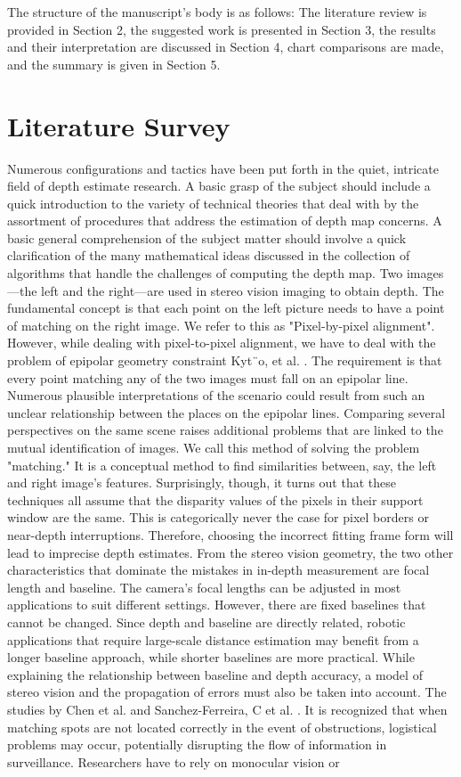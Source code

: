 \documentclass[sn-mathphys]{sn-jnl}%
\theoremstyle{thmstyleone}%
\theoremstyle{thmstyletwo}%
\theoremstyle{thmstylethree}%
\begin{document}
The structure of the manuscript's body is as follows: The literature review is provided in Section 2, the suggested work is presented in Section 3, the results and their interpretation are discussed in Section 4, chart comparisons are made, and the summary is given in Section 5.

\section{Literature Survey}\label{sec2}

Numerous configurations and tactics have been put forth in the quiet, intricate field of depth estimate research. A basic grasp of the subject should include a quick introduction to the variety of technical theories that deal with by the assortment of procedures that address the estimation of depth map concerns. A basic general comprehension of the subject matter should involve a quick clarification of the many mathematical ideas discussed in the collection of algorithms that handle the challenges of computing the depth map. Two images—the left and the right—are used in stereo vision imaging to obtain depth. The fundamental concept is that each point on the left picture needs to have a point of matching on the right image. We refer to this as "Pixel-by-pixel alignment". However, while dealing with pixel-to-pixel alignment, we have to deal with the problem of epipolar geometry constraint Kyt¨o, et al. \cite{bib2}. The requirement is that every point matching any of the two images must fall on an epipolar line. Numerous plausible interpretations of the scenario could result from such an unclear relationship between the places on the epipolar lines. Comparing several perspectives on the same scene raises additional problems that are linked to the mutual identification of images. We call this method of solving the problem "matching." It is a conceptual method \cite{bib3} to find similarities between, say, the left and right image's features. Surprisingly, though, it turns out that these techniques all assume that the disparity values of the pixels in their support window are the same. This is categorically never the case for pixel borders or near-depth interruptions. Therefore, choosing the incorrect fitting frame form will lead to imprecise depth estimates. From the stereo vision geometry, the two other characteristics that dominate the mistakes in in-depth measurement are focal length and baseline. The camera's focal lengths can be adjusted in most applications to suit different settings. However, there are fixed baselines that cannot be changed. Since depth and baseline are directly related, robotic applications that require large-scale distance estimation may benefit from a longer baseline approach, while shorter baselines are more practical. While explaining the relationship between baseline and depth accuracy, a model of stereo vision and the propagation of errors must also be taken into account. The studies by Chen et al. \cite{bib4} and Sanchez-Ferreira, C et al. \cite{bib5}. It is recognized that when matching spots are not located correctly in the event of obstructions, logistical problems may occur, potentially disrupting the flow of information in surveillance. Researchers have to rely on monocular vision or 
\end{document}
